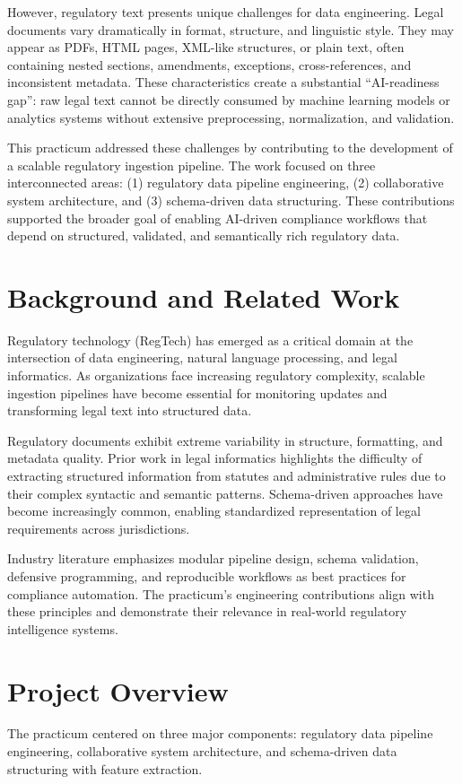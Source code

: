 \documentclass[sigconf]{acmart}
\begin{document}
However, regulatory text presents unique challenges for data engineering. Legal documents vary dramatically in format, structure, and linguistic style. They may appear as PDFs, HTML pages, XML-like structures, or plain text, often containing nested sections, amendments, exceptions, cross-references, and inconsistent metadata. These characteristics create a substantial “AI-readiness gap”: raw legal text cannot be directly consumed by machine learning models or analytics systems without extensive preprocessing, normalization, and validation.

This practicum addressed these challenges by contributing to the development of a scalable regulatory ingestion pipeline. The work focused on three interconnected areas: (1) regulatory data pipeline engineering, (2) collaborative system architecture, and (3) schema-driven data structuring. These contributions supported the broader goal of enabling AI-driven compliance workflows that depend on structured, validated, and semantically rich regulatory data.

\section{Background and Related Work}
Regulatory technology (RegTech) has emerged as a critical domain at the intersection of data engineering, natural language processing, and legal informatics. As organizations face increasing regulatory complexity, scalable ingestion pipelines have become essential for monitoring updates and transforming legal text into structured data.

Regulatory documents exhibit extreme variability in structure, formatting, and metadata quality. Prior work in legal informatics highlights the difficulty of extracting structured information from statutes and administrative rules due to their complex syntactic and semantic patterns. Schema-driven approaches have become increasingly common, enabling standardized representation of legal requirements across jurisdictions.

Industry literature emphasizes modular pipeline design, schema validation, defensive programming, and reproducible workflows as best practices for compliance automation. The practicum’s engineering contributions align with these principles and demonstrate their relevance in real-world regulatory intelligence systems.

\section{Project Overview}
The practicum centered on three major components: regulatory data pipeline engineering, collaborative system architecture, and schema-driven data structuring with feature extraction.
\end{document}
